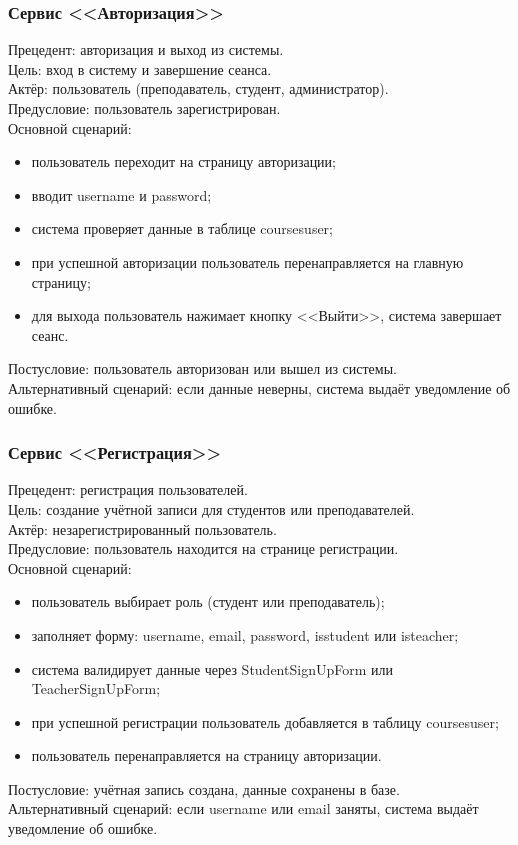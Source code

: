 \subsubsection{Сервис <<Авторизация>>}

{Прецедент: авторизация и выход из системы}. \\
{Цель}: вход в систему и завершение сеанса. \\
{Актёр}: пользователь (преподаватель, студент, администратор). \\
{Предусловие}: пользователь зарегистрирован. \\
{Основной сценарий}:
\begin{itemize}
	\item пользователь переходит на страницу авторизации;
	\item вводит username и password;
	\item система проверяет данные в таблице coursesuser;
	\item при успешной авторизации пользователь перенаправляется на главную страницу;
	\item для выхода пользователь нажимает кнопку <<Выйти>>, система завершает сеанс.
\end{itemize}
{Постусловие}: пользователь авторизован или вышел из системы. \\
{Альтернативный сценарий}: если данные неверны, система выдаёт уведомление об ошибке.

\subsubsection{Сервис <<Регистрация>>}

{Прецедент: регистрация пользователей}. \\
{Цель}: создание учётной записи для студентов или преподавателей. \\
{Актёр}: незарегистрированный пользователь. \\
{Предусловие}: пользователь находится на странице регистрации. \\
{Основной сценарий}:
\begin{itemize}
	\item пользователь выбирает роль (студент или преподаватель);
	\item заполняет форму: username, email, password, isstudent или isteacher;
	\item система валидирует данные через StudentSignUpForm или TeacherSignUpForm;
	\item при успешной регистрации пользователь добавляется в таблицу coursesuser;
	\item пользователь перенаправляется на страницу авторизации.
\end{itemize}
{Постусловие}: учётная запись создана, данные сохранены в базе. \\
{Альтернативный сценарий}: если username или email заняты, система выдаёт уведомление об ошибке.

